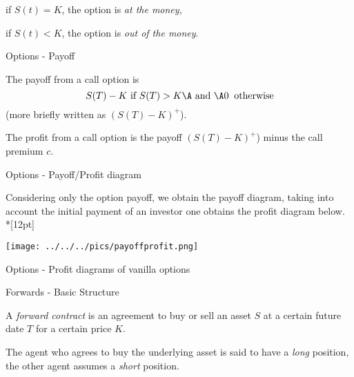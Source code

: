 	if $S(t) = K$, the option is {\it at the money},

	if $S(t) < K$, the option is {\it out of the money}.


{Options - Payoff}


	The payoff from a call option is $$ S(T) - K \mbox{ if } S(T)
> K\A \mbox{ and }\A 0 \;\; \mbox{otherwise} $$ (more briefly
written as  $(S(T) - K)^+$).

	The profit from a call option is the payoff $(S(T) - K)^+$) minus the call premium $c$.



{Options - Payoff/Profit diagram }

Considering only the option payoff, we obtain the payoff diagram, taking into account the initial payment of an investor one obtains the profit diagram below.\\*[12pt]

\begin{center}
\texttt{[image: ../../../pics/payoffprofit.png]}
\end{center}

{Options - Profit diagrams of vanilla options}
\begin{figure}
  \centering
   \qquad
\end{figure}


{Forwards - Basic Structure}


	A {\it forward contract}
is an agreement to buy or sell an asset $S$ at a certain future
date $T$ for a certain price $K$.

	The agent who agrees to
buy the underlying asset is said to have a {\it long} position,
the other agent assumes a {\it short} position.

